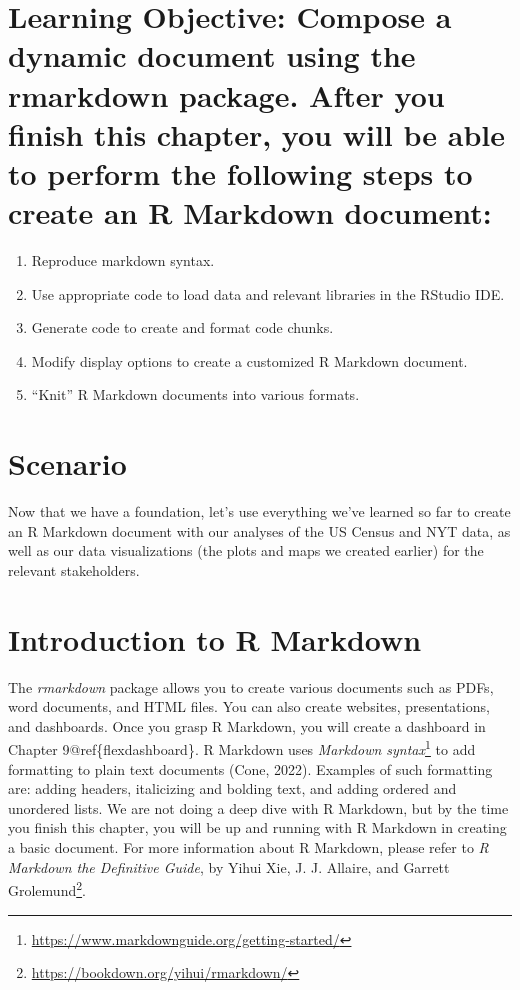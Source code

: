 \documentclass[
  krantz2]{krantz}
\providecommand{\tightlist}{%
  \setlength{\itemsep}{0pt}\setlength{\parskip}{0pt}}
\begin{document}
\hypertarget{rmarkdown-los}{%
\section{Learning Objective: Compose a dynamic document using the rmarkdown package. After you finish this chapter, you will be able to perform the following steps to create an R Markdown document:}\label{rmarkdown-los}}

\begin{enumerate}
\def\labelenumi{\arabic{enumi}.}
\tightlist
\item
  Reproduce markdown syntax.
\item
  Use appropriate code to load data and relevant libraries in the RStudio IDE.
\item
  Generate code to create and format code chunks.
\item
  Modify display options to create a customized R Markdown document.
\item
  ``Knit'' R Markdown documents into various formats.
\end{enumerate}

\hypertarget{rmarkdown-scenario}{%
\section{Scenario}\label{rmarkdown-scenario}}

Now that we have a foundation, let's use everything we've learned so far to create an R Markdown document with our analyses of the US Census and NYT data, as well as our data visualizations (the plots and maps we created earlier) for the relevant stakeholders.

\hypertarget{rmarkdown-intro}{%
\section{Introduction to R Markdown}\label{rmarkdown-intro}}

The \emph{rmarkdown} package allows you to create various documents such as PDFs, word documents, and HTML files. You can also create websites, presentations, and dashboards. Once you grasp R Markdown, you will create a dashboard in Chapter 9@ref\{flexdashboard\}. R Markdown uses \emph{Markdown syntax}\footnote{\url{https://www.markdownguide.org/getting-started/}} to add formatting to plain text documents (Cone, 2022). Examples of such formatting are: adding headers, italicizing and bolding text, and adding ordered and unordered lists. We are not doing a deep dive with R Markdown, but by the time you finish this chapter, you will be up and running with R Markdown in creating a basic document. For more information about R Markdown, please refer to \emph{R Markdown the Definitive Guide}, by Yihui Xie, J. J. Allaire, and Garrett Grolemund\footnote{\url{https://bookdown.org/yihui/rmarkdown/}}.
\end{document}
